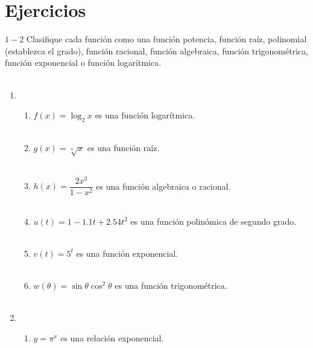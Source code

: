 \section{Ejercicios}
$1-2$ Clasifique cada función como una función potencia, función raíz, polinomial (establezca el grado), función racional, función algebraica, función trigonométrica, función exponencial o función logarítmica.\\\\

\begin{enumerate}

    \item 
    \begin{enumerate}[\bfseries (a)]

	\item $f(x)=\log_2 x$ es una función logarítmica.\\\\

	\item $g(x)=\sqrt[4]{x}$ es una función raíz.\\\\

	\item $h(x)=\dfrac{2x^3}{1-x^2}$ es una función algebraica o racional.\\\\

	\item $u(t)=1-1.1t+2.54t^2$ es una función polinómica de segundo grado.\\\\

	\item $v(t)=5^t$ es una función exponencial.\\\\

	\item $w(\theta) = \sin \theta \cos^2 \theta$ es una función trigonométrica.\\\\
    \end{enumerate}

    \item 
    \begin{enumerate}[\bfseries (a)]

	\item $y=\pi^x$ es una relación exponencial.\\\\


\end{enumerate}
\end{enumerate}

